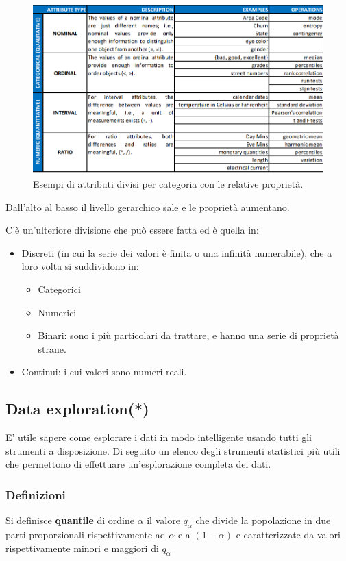 \begin{figure}[H]
	\centering
	\includegraphics[height=0.5 \linewidth]{introduction/pict/attributi.png}
	\caption{Esempi di attributi divisi per categoria con le relative proprietà.}
\end{figure}
Dall'alto al basso il livello gerarchico sale e le proprietà aumentano.

C'è un'ulteriore divisione che può essere fatta ed è quella in:
\begin{itemize}
	\item Discreti (in cui la serie dei valori è finita o una infinità numerabile), che a loro volta si suddividono in:
	\begin{itemize}
		\item Categorici
		\item Numerici
		\item Binari: sono i più particolari da trattare, e hanno una serie di proprietà strane.
	\end{itemize}
	\item Continui: i cui valori sono numeri reali.
\end{itemize}

\subsection{Data exploration(*)}

E' utile sapere come esplorare i dati in modo intelligente usando tutti gli strumenti a disposizione. Di seguito un elenco degli strumenti statistici più utili che permettono di effettuare un'esplorazione completa dei dati.

\subsubsection{Definizioni}
\begin{defn}
	Si definisce \textbf{quantile} di ordine $\alpha$ il valore $q_{\alpha}$ che divide la popolazione in due parti proporzionali rispettivamente ad $\alpha$ e a $(1 - \alpha)$ e caratterizzate da valori rispettivamente minori e maggiori di $q_{\alpha}$
\end{defn}

